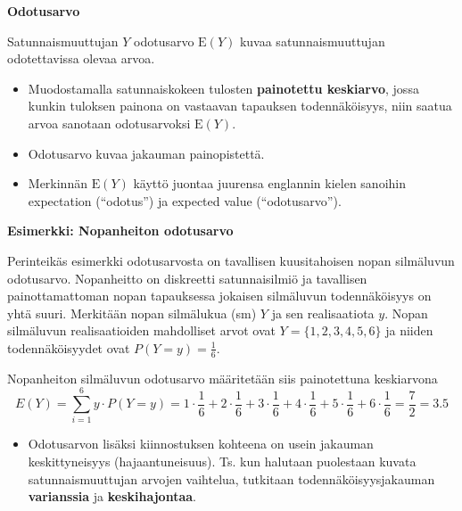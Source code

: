\documentclass[
]{book}
\providecommand{\tightlist}{%
  \setlength{\itemsep}{0pt}\setlength{\parskip}{0pt}}
\begin{document}
\begin{defblock}{}

\textbf{Odotusarvo}

Satunnaismuuttujan \(Y\) odotusarvo \(\text{E}(Y)\) kuvaa satunnaismuuttujan odotettavissa olevaa arvoa.

\begin{itemize}
\tightlist
\item
  Muodostamalla satunnaiskokeen tulosten \textbf{painotettu keskiarvo}, jossa kunkin tuloksen painona on vastaavan tapauksen todennäköisyys, niin saatua arvoa sanotaan odotusarvoksi \(\text{E}(Y)\).
\item
  Odotusarvo kuvaa jakauman painopistettä.
\item
  Merkinnän \(\text{E}(Y)\) käyttö juontaa juurensa englannin kielen sanoihin expectation (``odotus'') ja expected value (``odotusarvo'').
\end{itemize}

\end{defblock}

\begin{eblock}{}
\textbf{Esimerkki: Nopanheiton odotusarvo}

Perinteikäs esimerkki odotusarvosta on tavallisen kuusitahoisen nopan silmäluvun odotusarvo. Nopanheitto on diskreetti satunnaisilmiö ja tavallisen painottamattoman nopan tapauksessa jokaisen silmäluvun todennäköisyys on yhtä suuri. Merkitään nopan silmälukua (sm) \(Y\) ja sen realisaatiota \(y\). Nopan silmäluvun realisaatioiden mahdolliset arvot ovat \(Y = \{1,2,3,4,5,6\}\) ja niiden todennäköisyydet ovat \(P(Y=y) = \frac{1}{6}\).

Nopanheiton silmäluvun odotusarvo määritetään siis painotettuna keskiarvona \[E(Y) = \sum_{i=1}^6 y \cdot P(Y=y)  = 1 \cdot \frac{1}{6} + 2 \cdot \frac{1}{6} + 3 \cdot \frac{1}{6} + 4 \cdot \frac{1}{6} + 5 \cdot \frac{1}{6} + 6 \cdot \frac{1}{6} = \frac{7}{2} = 3.5\]

\end{eblock}

\begin{itemize}
\tightlist
\item
  Odotusarvon lisäksi kiinnostuksen kohteena on usein jakauman keskittyneisyys (hajaantuneisuus). Ts. kun halutaan puolestaan kuvata satunnaismuuttujan arvojen vaihtelua, tutkitaan todennäköisyysjakauman \textbf{varianssia} ja \textbf{keskihajontaa}.
\end{itemize}
\end{document}
